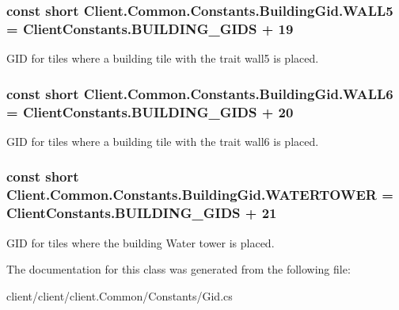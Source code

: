\hypertarget{classClient_1_1Common_1_1Constants_1_1BuildingGid_a02ed00c8a873b948ddbc108e5f6a97a4}{}
\subsubsection[{W\+A\+L\+L5}]{\setlength{\rightskip}{0pt plus 5cm}const short Client.\+Common.\+Constants.\+Building\+Gid.\+W\+A\+L\+L5 = {\bf Client\+Constants.\+B\+U\+I\+L\+D\+I\+N\+G\+\_\+\+G\+I\+D\+S} + 19}\label{classClient_1_1Common_1_1Constants_1_1BuildingGid_a02ed00c8a873b948ddbc108e5f6a97a4}


G\+I\+D for tiles where a building tile with the trait wall5 is placed. 

\hypertarget{classClient_1_1Common_1_1Constants_1_1BuildingGid_af82da441a2417d681d62e1edf3da9a40}{}
\subsubsection[{W\+A\+L\+L6}]{\setlength{\rightskip}{0pt plus 5cm}const short Client.\+Common.\+Constants.\+Building\+Gid.\+W\+A\+L\+L6 = {\bf Client\+Constants.\+B\+U\+I\+L\+D\+I\+N\+G\+\_\+\+G\+I\+D\+S} + 20}\label{classClient_1_1Common_1_1Constants_1_1BuildingGid_af82da441a2417d681d62e1edf3da9a40}


G\+I\+D for tiles where a building tile with the trait wall6 is placed. 

\hypertarget{classClient_1_1Common_1_1Constants_1_1BuildingGid_a700ea8d166e5210b1dea7f42506df381}{}
\subsubsection[{W\+A\+T\+E\+R\+T\+O\+W\+E\+R}]{\setlength{\rightskip}{0pt plus 5cm}const short Client.\+Common.\+Constants.\+Building\+Gid.\+W\+A\+T\+E\+R\+T\+O\+W\+E\+R = {\bf Client\+Constants.\+B\+U\+I\+L\+D\+I\+N\+G\+\_\+\+G\+I\+D\+S} + 21}\label{classClient_1_1Common_1_1Constants_1_1BuildingGid_a700ea8d166e5210b1dea7f42506df381}


G\+I\+D for tiles where the building Water tower is placed. 



The documentation for this class was generated from the following file\+:\begin{DoxyCompactItemize}
\item 
client/client/client.\+Common/\+Constants/Gid.\+cs\end{DoxyCompactItemize}
